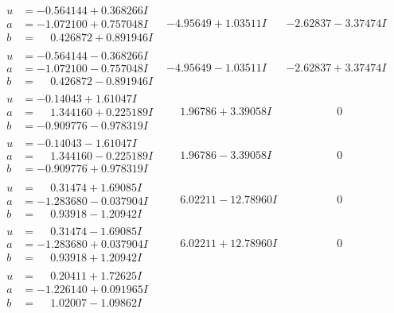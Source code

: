 \documentclass[1p]{elsarticle_modified}
\theoremstyle{definition}
\begin{document}
$$\begin{array}{c|c|c}
\begin{aligned}
u &= -0.564144 + 0.368266 I \\
a &= -1.072100 + 0.757048 I \\
b &= \phantom{-}0.426872 + 0.891946 I\end{aligned}
 & -4.95649 + 1.03511 I & -2.62837 - 3.37474 I \\ \hline\begin{aligned}
u &= -0.564144 - 0.368266 I \\
a &= -1.072100 - 0.757048 I \\
b &= \phantom{-}0.426872 - 0.891946 I\end{aligned}
 & -4.95649 - 1.03511 I & -2.62837 + 3.37474 I \\ \hline\begin{aligned}
u &= -0.14043 + 1.61047 I \\
a &= \phantom{-}1.344160 + 0.225189 I \\
b &= -0.909776 - 0.978319 I\end{aligned}
 & \phantom{-}1.96786 + 3.39058 I & \phantom{-0.000000 } 0 \\ \hline\begin{aligned}
u &= -0.14043 - 1.61047 I \\
a &= \phantom{-}1.344160 - 0.225189 I \\
b &= -0.909776 + 0.978319 I\end{aligned}
 & \phantom{-}1.96786 - 3.39058 I & \phantom{-0.000000 } 0 \\ \hline\begin{aligned}
u &= \phantom{-}0.31474 + 1.69085 I \\
a &= -1.283680 - 0.037904 I \\
b &= \phantom{-}0.93918 - 1.20942 I\end{aligned}
 & \phantom{-}6.02211 - 12.78960 I & \phantom{-0.000000 } 0 \\ \hline\begin{aligned}
u &= \phantom{-}0.31474 - 1.69085 I \\
a &= -1.283680 + 0.037904 I \\
b &= \phantom{-}0.93918 + 1.20942 I\end{aligned}
 & \phantom{-}6.02211 + 12.78960 I & \phantom{-0.000000 } 0 \\ \hline\begin{aligned}
u &= \phantom{-}0.20411 + 1.72625 I \\
a &= -1.226140 + 0.091965 I \\
b &= \phantom{-}1.02007 - 1.09862 I\end{aligned}

\end{array}$$
\end{document}
